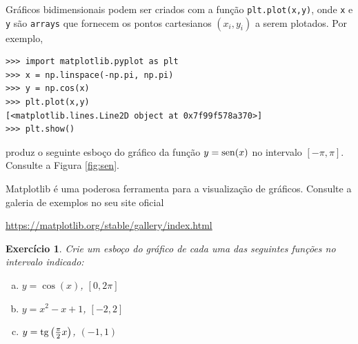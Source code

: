 \documentclass[12pt]{article}
\newtheorem{exr}{Exercício}[section]
\begin{document}
Gráficos bidimensionais podem ser criados com a função \lstinline+plt.plot(x,y)+, onde \lstinline+x+ e \lstinline+y+ são \lstinline+arrays+ que fornecem os pontos cartesianos $(x_i, y_i)$ a serem plotados. Por exemplo,
\begin{lstlisting}
>>> import matplotlib.pyplot as plt
>>> x = np.linspace(-np.pi, np.pi)
>>> y = np.cos(x)
>>> plt.plot(x,y)
[<matplotlib.lines.Line2D object at 0x7f99f578a370>]
>>> plt.show()
\end{lstlisting}
produz o seguinte esboço do gráfico da função $y=\operatorname{sen}(x)$ no intervalo $[-\pi,\pi]$. Consulte a Figura \ref{fig:sen}.


\begin{obs}
  Matplotlib é uma poderosa ferramenta para a visualização de gráficos. Consulte a galeria de exemplos no seu site oficial
  \begin{center}
    \url{https://matplotlib.org/stable/gallery/index.html}
  \end{center}
\end{obs}

\begin{exr}
  Crie um esboço do gráfico de cada uma das seguintes funções no intervalo indicado:
  \begin{enumerate}[a)]
  \item $y = \cos(x)$, $\left[0, 2\pi\right]$
  \item $y = x^2 - x + 1$, $[-2, 2]$
  \item $y = \operatorname{tg}\left(\frac{\pi}{2}x\right)$, $(-1, 1)$
  \end{enumerate}
\end{exr}

\nocite{*}
% 

\end{document}
